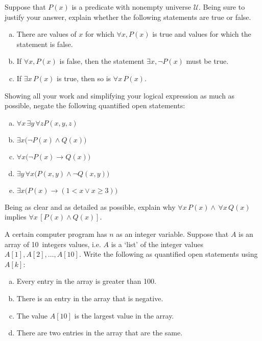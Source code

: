 \documentclass[11pt,letterpaper]{article}
\begin{document}

 Suppose that $P(x)$ is a predicate with nonempty universe $\mathcal{U}$. Being sure to justify your answer, explain whether the following statements are true or false.
	\begin{enumerate}[(a)]
	\item There are values of $x$ for which $\forall x, P(x)$ is true and values for which the statement is false. 
	\item If $\forall x, P(x)$ is false, then the statement $\exists x, \neg P(x)$ must be true. 
	\item If $\exists x\, P(x)$ is true, then so is $\forall x\, P(x)$.
	\end{enumerate} 



\newpage



 Showing all your work and simplifying your logical expression as much as possible, negate the following quantified open statements:
	\begin{enumerate}[(a)]
	\item $\forall x\, \exists y\, \forall z P(x, y, z)$
	\item $\exists x \big( \neg P(x) \wedge Q(x) \big)$
	\item $\forall x \big( \neg P(x) \to Q(x) \big)$
	\item $\exists y\, \forall x \big( P(x, y) \wedge \neg Q(x, y) \big)$
	\item $\exists x \big( P(x) \to (1 < x \vee x \geq 3) \big)$
	\end{enumerate} 



\newpage



 Being as clear and as detailed as possible, explain why $\forall x\, P(x) \wedge\, \forall x\, Q(x)$ implies $\forall x \, [P(x) \wedge Q(x)]$. \pspace



\newpage



 A certain computer program has $n$ as an integer variable. Suppose that $A$ is an array of 10~integers values, i.e. $A$ is a `list' of the integer values $A[1], A[2], \ldots, A[10]$. Write the following as quantified open statements using $A[k]$:
	\begin{enumerate}[(a)]
	\item Every entry in the array is greater than 100.
	\item There is an entry in the array that is negative. 
	\item The value $A[10]$ is the largest value in the array.
	\item There are two entries in the array that are the same. 
	\end{enumerate} 
\end{document}
